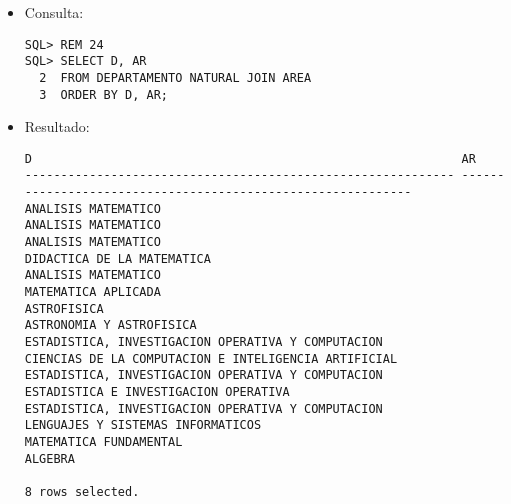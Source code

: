 \documentclass[11pt]{report}
\begin{document}
\begin{itemize}
  \item Consulta:
  \begin{verbatim}
SQL> REM 24
SQL> SELECT D, AR
  2  FROM DEPARTAMENTO NATURAL JOIN AREA
  3  ORDER BY D, AR;
  \end{verbatim}
  \item{Resultado:}
  \begin{verbatim}
D                                                            AR                                                                                                                     
------------------------------------------------------------ ------------------------------------------------------------                                                           
ANALISIS MATEMATICO                                          ANALISIS MATEMATICO                                                                                                    
ANALISIS MATEMATICO                                          DIDACTICA DE LA MATEMATICA                                                                                             
ANALISIS MATEMATICO                                          MATEMATICA APLICADA                                                                                                    
ASTROFISICA                                                  ASTRONOMIA Y ASTROFISICA                                                                                               
ESTADISTICA, INVESTIGACION OPERATIVA Y COMPUTACION           CIENCIAS DE LA COMPUTACION E INTELIGENCIA ARTIFICIAL                                                                   
ESTADISTICA, INVESTIGACION OPERATIVA Y COMPUTACION           ESTADISTICA E INVESTIGACION OPERATIVA                                                                                  
ESTADISTICA, INVESTIGACION OPERATIVA Y COMPUTACION           LENGUAJES Y SISTEMAS INFORMATICOS                                                                                      
MATEMATICA FUNDAMENTAL                                       ALGEBRA                                                                                                                

8 rows selected.
  \end{verbatim}
\end{itemize}
\end{document}
